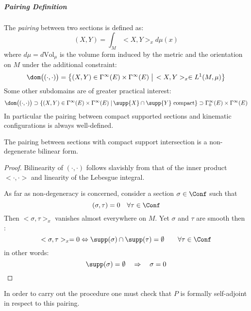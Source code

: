 \documentclass[Main]{subfiles}
\begin{document}
			\subparagraph{Pairing Definition}

				The \emph{pairing} between two sections is defined as:
   					\begin{equation}\label{Def:Pairing}
   								(X,Y) = \int_M <X,Y>_x d\mu(x)
   					\end{equation}
   				where $d\mu = d\textrm{Vol}_\mu$ is the volume form induced by the metric and the orientation on $M$
 				 under the additional constraint:
   				\begin{displaymath}
   					\dom\big( (\cdot, \cdot) \big) =
   					\big\{(X,Y) \in \Gamma^\infty(E) \times \Gamma^\infty(E) \; \big\vert \,  <X,Y>_x \in L^1(M,\mu)\big \}
   				\end{displaymath}
   				Some other subdomains are of greater practical interest:
   				\begin{displaymath}
   					\dom\big( (\cdot, \cdot) \big) \supset \{ (X,Y) \in \Gamma^\infty(E) \times \Gamma^\infty(E) \; \vert \, \supp{X} \cap \supp{Y} \textrm{ compact} \} \supset \Gamma^\infty_0 (E) \times \Gamma^\infty(E)
   				\end{displaymath}
   				In particular the pairing between compact supported sections and kinematic configurations is always well-defined.
   				\begin{proposition}
   					The pairing between sections with compact support intersection is a non-degenerate bilinear form.
   				\end{proposition}
   				\begin{proof}
					Bilinearity of $(\cdot,\cdot)$ follows slavishly from that
					of the inner product $<\cdot,\cdot>$ and linearity of the Lebesgue integral.

					As far as non-degeneracy is concerned, consider a section $\sigma \in \Conf$ such that $$(\sigma, \tau) = 0 \quad \forall \tau \in \Conf$$
   					Then $<\sigma, \tau>_x$ vanishes almost everywhere on $M$.
   					Yet $\sigma$ and $\tau$ are smooth then :
   					\begin{displaymath}
   						<\sigma, \tau >_x = 0 \Leftrightarrow \supp(\sigma) \cap \supp(\tau) = \emptyset \qquad \forall \tau \in \Conf
   					\end{displaymath}
   					in other words:
   					$$\supp(\sigma) = \emptyset \quad \Rightarrow \quad \sigma=0$$
   				\end{proof}

   				In order to carry out the procedure one must check that $P$ is formally self-adjoint in respect to this pairing.
\end{document}
